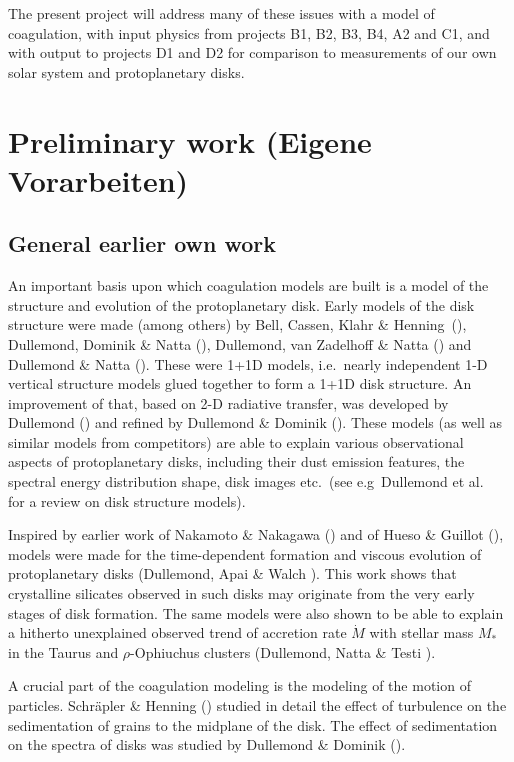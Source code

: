 The present project will address many of these issues with a model of
coagulation, with input physics from projects B1, B2, B3, B4, A2 and C1,
and with output to projects D1 and D2 for comparison to measurements
of our own solar system and protoplanetary disks.

\section{Preliminary work (Eigene Vorarbeiten)}\label{sec-prelim}
\subsection{General earlier own work}
An important basis upon which coagulation models are built is a model of the
structure and evolution of the protoplanetary disk. Early models of the
disk structure were made (among others) by Bell, Cassen, Klahr \&
Henning~(), Dullemond, Dominik \& Natta (), Dullemond,
van Zadelhoff \& Natta () and Dullemond \& Natta
(). These were 1+1D models, i.e.\ nearly independent 1-D
vertical structure models glued together to form a 1+1D disk structure. An
improvement of that, based on 2-D radiative transfer, was developed by
Dullemond () and refined by Dullemond \& Dominik
(). These models (as well as similar models from competitors) are
able to explain various observational aspects of protoplanetary disks,
including their dust emission features, the spectral energy distribution
shape, disk images etc.~(see e.g~Dullemond et al.~ for a review on
disk structure models). 

Inspired by earlier work of Nakamoto \& Nakagawa () and of Hueso
\& Guillot (), models were made for the time-dependent formation
and viscous evolution of protoplanetary disks (Dullemond, Apai \& Walch
). This work shows that crystalline silicates observed in such
disks may originate from the very early stages of disk formation. The same
models were also shown to be able to explain a hitherto unexplained observed
trend of accretion rate $\dot M$ with stellar mass $M_{*}$ in the Taurus and
$\rho$-Ophiuchus clusters (Dullemond, Natta \& Testi ).

A crucial part of the coagulation modeling is the modeling of the motion of
particles. Schr\"apler \& Henning () studied in
detail the effect of turbulence on the sedimentation of grains to the
midplane of the disk. The effect of sedimentation on the spectra of disks
was studied by Dullemond \& Dominik ().

